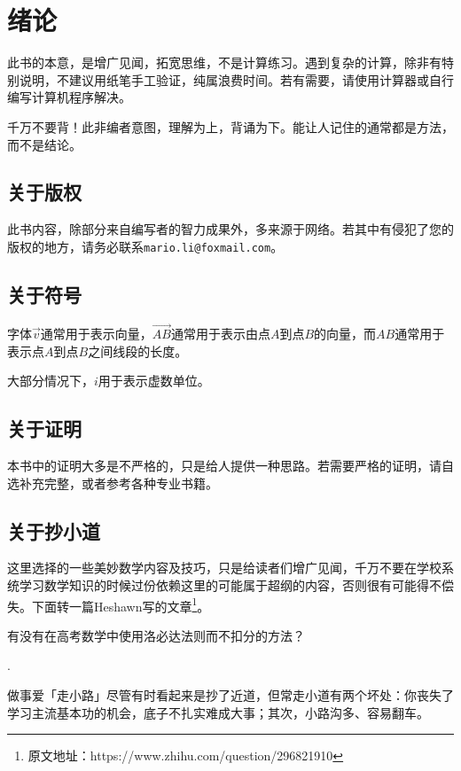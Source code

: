 
\chapter{绪论}
\label{chap:introduction}

此书的本意，是增广见闻，拓宽思维，不是计算练习。遇到复杂的计算，除非有特别说明，不建议用纸笔手工验证，纯属浪费时间。若有需要，请使用计算器或自行编写计算机程序解决。

千万不要背！此非编者意图，理解为上，背诵为下。能让人记住的通常都是方法，而不是结论。

\section{关于版权}
\label{sec:copyright}

此书内容，除部分来自编写者的智力成果外，多来源于网络。若其中有侵犯了您的版权的地方，请务必联系\verb|mario.li@foxmail.com|。

\section{关于符号}
\label{sec:symbol}

字体$\vec{v}$通常用于表示向量，$\vec{AB}$通常用于表示由点$A$到点$B$的向量，而$AB$通常用于表示点$A$到点$B$之间线段的长度。

大部分情况下，$i$用于表示虚数单位。

\section{关于证明}
\label{sec:about-proof}

本书中的证明大多是不严格的，只是给人提供一种思路。若需要严格的证明，请自选补充完整，或者参考各种专业书籍。

\section{关于抄小道}

这里选择的一些美妙数学内容及技巧，只是给读者们增广见闻，千万不要在学校系统学习数学知识的时候过份依赖这里的可能属于超纲的内容，否则很有可能得不偿失。下面转一篇Heshawn写的文章\footnote{原文地址：https://www.zhihu.com/question/296821910}。

\begin{example}
  有没有在高考数学中使用洛必达法则而不扣分的方法？
\end{example}
.

  做事爱「走小路」尽管有时看起来是抄了近道，但常走小道有两个坏处：你丧失了学习主流基本功的机会，底子不扎实难成大事；其次，小路沟多、容易翻车。

